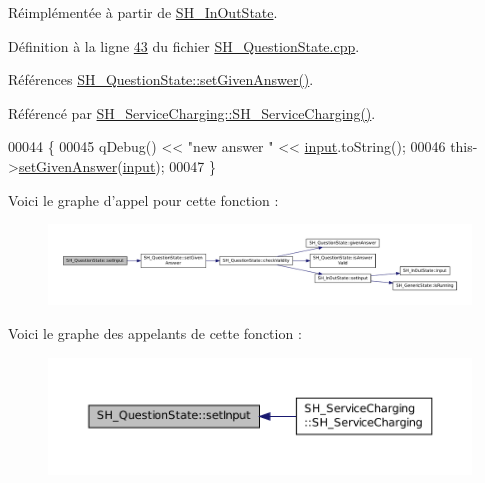 Réimplémentée à partir de \hyperlink{classSH__InOutState_aaec9c2b5ef7c406bff7469461352d47c}{S\-H\-\_\-\-In\-Out\-State}.



Définition à la ligne \hyperlink{SH__QuestionState_8cpp_source_l00043}{43} du fichier \hyperlink{SH__QuestionState_8cpp_source}{S\-H\-\_\-\-Question\-State.\-cpp}.



Références \hyperlink{classSH__QuestionState_a8fec0a91aed0b2b1699db17169873eb0}{S\-H\-\_\-\-Question\-State\-::set\-Given\-Answer()}.



Référencé par \hyperlink{classSH__ServiceCharging_afa5273d046049b1c2b020a6a19a8290b}{S\-H\-\_\-\-Service\-Charging\-::\-S\-H\-\_\-\-Service\-Charging()}.


\begin{DoxyCode}
00044 \{
00045     qDebug() << \textcolor{stringliteral}{"new answer "} << \hyperlink{classSH__InOutState_a8e1b78069343122df7713624a1a5a100}{input}.toString();
00046     this->\hyperlink{classSH__QuestionState_a8fec0a91aed0b2b1699db17169873eb0}{setGivenAnswer}(\hyperlink{classSH__InOutState_a8e1b78069343122df7713624a1a5a100}{input});
00047 \}
\end{DoxyCode}


Voici le graphe d'appel pour cette fonction \-:\nopagebreak
\begin{figure}[H]
\begin{center}
\leavevmode
\includegraphics[width=350pt]{classSH__QuestionState_ab40b6202090d1afcc965e124b2deb88a_cgraph}
\end{center}
\end{figure}




Voici le graphe des appelants de cette fonction \-:\nopagebreak
\begin{figure}[H]
\begin{center}
\leavevmode
\includegraphics[width=350pt]{classSH__QuestionState_ab40b6202090d1afcc965e124b2deb88a_icgraph}
\end{center}
\end{figure}


